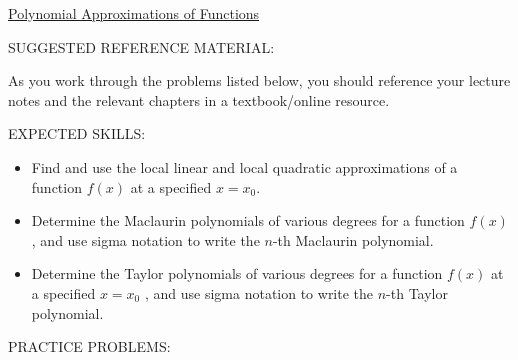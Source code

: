 \documentclass[12pt]{article}
\begin{document}
\begin{center}
\underline{\LARGE{Polynomial Approximations of Functions}}
\end{center}

\noindent SUGGESTED REFERENCE MATERIAL:

\medskip

\noindent As you work through the problems listed below, you should reference your lecture notes and the relevant chapters in a textbook/online resource.

\medskip

\noindent EXPECTED SKILLS:

\medskip

\begin{itemize}[topsep=0pt]

\item Find and use the local linear and local quadratic approximations of a function $f(x)$ at a specified $x=x_0$.

\item Determine the Maclaurin polynomials of various degrees for a function $f(x)$, and use sigma notation to write the $n$-th Maclaurin polynomial.

\item Determine the Taylor polynomials of various degrees for a function $f(x)$ at a specified $x=x_0$ , and use sigma notation to write the $n$-th Taylor polynomial.

\end{itemize}

\medskip

\noindent PRACTICE PROBLEMS:
\end{document}
